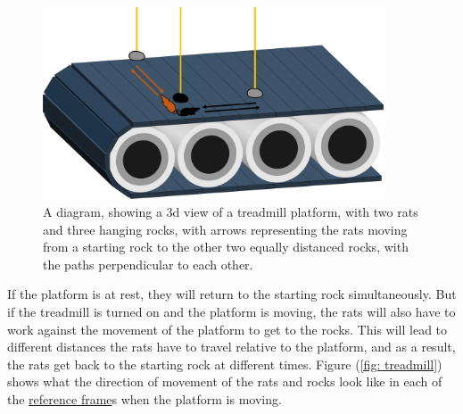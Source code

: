 \begin{figure}[H]
	\centering
	\includegraphics[width = 0.9\textwidth]{images/pdf/Conveyor_belt_3d.pdf}
	\caption{A diagram, showing a 3d view of a treadmill platform, with two rats and three hanging rocks, with arrows representing the rats moving from a starting rock to the other two equally distanced rocks, with the paths perpendicular to each other.}
	\label{fig: 3d conveyor belt}
\end{figure}

If the platform is at rest, they will return to the starting rock simultaneously.
But if the treadmill is turned on and the platform is moving, the rats will also have to work against the movement of the platform to get to the rocks.
This will lead to different distances the rats have to travel relative to the platform, and as a result, the rats get back to the starting rock at different times.
Figure (\ref{fig: treadmill}) shows what the direction of movement of the rats and rocks look like in each of the \hyperlink{def-Reference-frame}{reference frame}s when the platform is moving.

